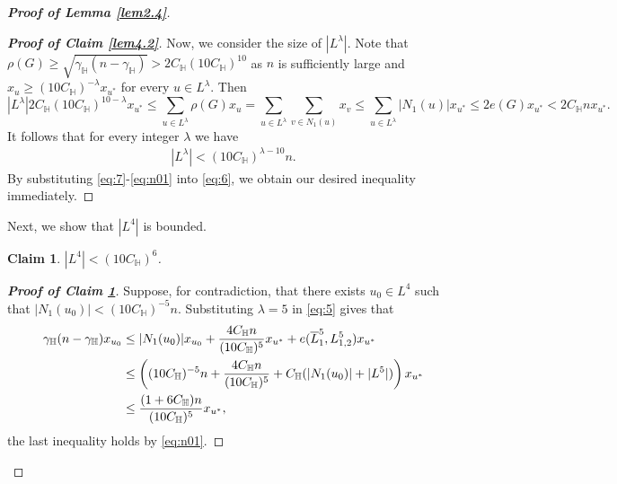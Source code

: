 \documentclass[11pt, a4paper]{article}
\newtheorem{claim}[theorem]{Claim}
\theoremstyle{definition}
\newcommand{\<}{\subseteq}
\begin{document}
\begin{proof}[\bf Proof of Lemma \ref{lem2.4}]
\begin{proof}[\bf Proof of Claim \ref{lem4.2}]
Now, we consider the size of $|L^{\lambda}|$. Note that  $\rho(G) \geq \sqrt{\gamma_\mathbb{H}(n-\gamma_\mathbb{H})}>2C_\mathbb{H}(10C_\mathbb{H})^{10}$ as $n$ is sufficiently large and $x_u \geq (10C_\mathbb{H})^{-\lambda}x_{u^*}$ for every $u\in L^{\lambda}$. Then  
    \[
    |L^{\lambda}|2C_\mathbb{H}(10C_\mathbb{H})^{10-\lambda}x_{u^*} \leq \sum_{u\in L^{\lambda}}\rho(G)x_u = \sum_{u\in L^{\lambda}}\sum_{v \in N_1(u)} x_v \leq \sum_{u\in L^{\lambda}}|N_1(u)|x_{u^*}\leq 2e(G)x_{u^*} < 2C_\mathbb{H}nx_{u^*}.
    \]
    It follows that for every 
integer $\lambda$ we have
\begin{align}\label{eq:n01}
    |L^\lambda| < (10C_\mathbb{H})^{\lambda-10}n.
\end{align}
    By substituting \eqref{eq:7}-\eqref{eq:n01} into \eqref{eq:6}, we obtain our desired inequality immediately. %
\end{proof}
    
    Next, we show that $|L^4|$ is bounded. %
   
\begin{claim}\label{lem4.3}
    $|L^4| < (10C_\mathbb{H})^6$.
    \end{claim}

\begin{proof}[\bf Proof of Claim \ref{lem4.3}]
    Suppose, for contradiction, that there exists \( u_0 \in L^4 \) such that \( |N_1(u_0)| < (10C_\mathbb{H})^{-5}n \). Substituting \( \lambda = 5 \) in \eqref{eq:5} gives that
    \begin{align}\notag
        \gamma_\mathbb{H}(n-\gamma_\mathbb{H})x_{u_0} &\leq |N_1(u_0)|x_{u_0} +  \frac{4C_\mathbb{H}n}{(10C_\mathbb{H})^{5}} x_{u^*} + e(\overline{L}_1^5, L_{1,2}^5) x_{u^*}\\\notag
        &\leq \left((10C_\mathbb{H})^{-5}n+\frac{4C_\mathbb{H}n}{(10C_\mathbb{H})^{5}}+C_\mathbb{H}(|N_1(u_0)| + |L^5|)\right)x_{u^*}\\\label{eq111}
        &\leq \frac{(1+6C_\mathbb{H})n}{(10C_\mathbb{H})^5}x_{u^*},
    \end{align}
 the last inequality holds by \eqref{eq:n01}. %


\end{proof}
\end{proof}
\end{document}
